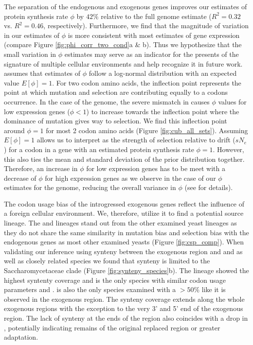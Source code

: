 The separation of the endogenous and exogenous genes improves our estimates of protein synthesis rate $\phi$ by $42 \%$ relative to the full genome estimate ($R^2 = 0.32$ vs. $R^2 = 0.46$, respectively).
Furthermore, we find that the magnitude of variation in our estimates of $\phi$ is more consistent with most estimates of gene expression (compare Figure \ref{fig:phi_corr_two_cond}a \& b).
Thus we hypothesize that the small variation in $\phi$ estimates may serve as an indicator for the presents of the signature of multiple cellular environments and help recognize it in future work.
\ROC assumes that estimates of $\phi$ follow a log-normal distribution with an expected value $E[\phi] = 1$. 
For two codon amino acids, the inflection point represents the point at which mutation and selection are contributing equally to a codons occurrence.
In the case of the \kluyveri genome, the severe mismatch in \DM causes $\phi$ values for low expression genes ($\phi < 1$) to increase towards the inflection point where the dominance of mutation gives way to selection.
We find this inflection point around $\phi = 1$ for most 2 codon amino acids (Figure \ref{fig:cub_all_sets}). 
Assuming $E[\phi] = 1$ allows us to interpret \DE as the strength of selection relative to drift ($sN_e$) for a codon in a gene with an estimated protein synthesis rate $\phi = 1$.
However, this also ties the mean and standard deviation of the prior distribution together.
Therefore, an increase in $\phi$ for low expression genes has to be meet with a decrease of $\phi$ for high expression genes as we observe in the case of our $\phi$ estimates for the \kluyveri genome, reducing the overall variance in $\phi$ (see \citet{gilchrist2015} for details). 

The codon usage bias of the introgressed exogenous genes reflect the influence of a foreign cellular environment.
We, therefore, utilize it to find a potential source lineage.
The \gossypii and \dubl lineages stand out from the other examined yeast lineages as they do not share the same similarity in mutation bias and selection bias with the endogenous genes as most other examined yeasts (Figure \ref{fig:csp_comp}).
When validating our inference using synteny between the exogenous region and \dubl and \gossypii as well as closely related species we found that synteny is limited to the Saccharomycetaceae clade (Figure \ref{fig:synteny_species}b).
The \gossypii lineage showed the highest syntenty coverage and is the only species with similar codon usage parameters \DM and \DE.
\gossypii is also the only species examined with a \GC $> 50 \%$ like it is observed in the exogenous region.
The synteny coverage extends along the whole exogenous regions with the exception to the very 3' and 5' end of the exogenous region. 
The lack of synteny at the ends of the region also coincides with a drop in \GC, potentially indicating remains of the original replaced region or greater adaptation.

